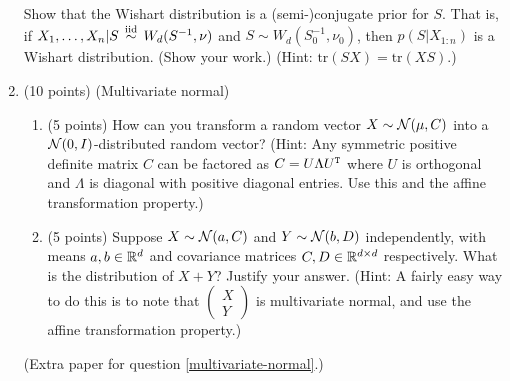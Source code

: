 \documentclass[12pt]{article}
\newcommand{\jmatrix}[1]{\begin{pmatrix}#1\end{pmatrix}}
\begin{document}
\begin{enumerate}
    Show that the Wishart distribution is a (semi-)conjugate prior for $S$. 
    That is, if $X_1,\ldots,X_n|S \,\stackrel{\mathrm{iid}}{\sim}\, W_d(S^{-1},\nu)$ and $S\sim W_d(S_0^{-1},\nu_0)$, then $p(S|X_{1:n})$ is a Wishart distribution.
    (Show your work.) (Hint: $\mathrm{tr}(S X) = \mathrm{tr}(X S)$.)


    
       
\newpage
\item\label{multivariate-normal} (10 points) (Multivariate normal)\\
    \begin{enumerate}
        \item (5 points) How can you transform a random vector $X\sim\mathcal{N}(\mu,C)$ into a $\mathcal{N}(0,I)$-distributed random vector? 
            (Hint: Any symmetric positive definite matrix $C$ can be factored as $C = U\Lambda U^{\mathtt{T}}$ where $U$ is orthogonal and
            $\Lambda$ is diagonal with positive diagonal entries. Use this and the affine transformation property.)
        \item (5 points) Suppose $X\sim\mathcal{N}(a,C)$ and $Y\sim\mathcal{N}(b,D)$ independently, 
        with means $a,b\in\mathbb{R}^d$ and covariance matrices $C,D\in\mathbb{R}^{d\times d}$ respectively.
        What is the distribution of $X + Y$? Justify your answer.
        (Hint: A fairly easy way to do this is to note that $\jmatrix{X\\Y}$ is multivariate normal, and use the affine transformation property.)
    \end{enumerate}
\newpage
(Extra paper for question \ref{multivariate-normal}.)
    
    
    
    


\end{enumerate}
\end{document}
